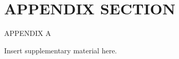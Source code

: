 \chapter*{APPENDIX SECTION}
\begin{center}
APPENDIX A
\end{center}

Insert supplementary material here.
